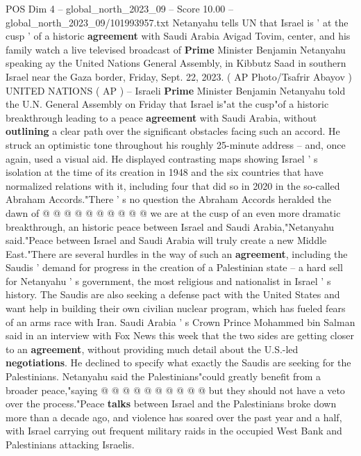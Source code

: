 \begin{textsample}{POS Dim 4 – global\_north\_2023\_09 – Score 10.00 – global\_north\_2023\_09/101993957.txt}  \label{ex:f4_pos_411}
Netanyahu tells UN that Israel is ' at the cusp ' of a historic \textbf{agreement} with Saudi Arabia Avigad Tovim, center, and his family watch a live televised broadcast of \textbf{Prime} Minister Benjamin Netanyahu speaking ay the United Nations General Assembly, in Kibbutz Saad in southern Israel near the Gaza border, Friday, Sept. 22, 2023. ( AP Photo/Tsafrir Abayov ) UNITED NATIONS ( AP ) -- Israeli \textbf{Prime} Minister Benjamin Netanyahu told the U.N.
General Assembly on Friday that Israel is"at the cusp"of a historic breakthrough leading to a peace \textbf{agreement} with Saudi Arabia, without \textbf{outlining} a clear path over the significant obstacles facing such an accord.
He struck an optimistic tone throughout his roughly 25-minute address -- and, once again, used a visual aid.
He displayed contrasting maps showing Israel ' s isolation at the time of its creation in 1948 and the six countries that have normalized relations with it, including four that did so in 2020 in the so-called Abraham Accords."There ' s no question the Abraham Accords heralded the dawn of @ @ @ @ @ @ @ @ @ @ we are at the cusp of an even more dramatic breakthrough, an historic peace between Israel and Saudi Arabia,"Netanyahu said."Peace between Israel and Saudi Arabia will truly create a new Middle East."There are several hurdles in the way of such an \textbf{agreement}, including the Saudis ' demand for progress in the creation of a Palestinian state -- a hard sell for Netanyahu ' s government, the most religious and nationalist in Israel ' s history.
The Saudis are also seeking a defense pact with the United States and want help in building their own civilian nuclear program, which has fueled fears of an arms race with Iran.
Saudi Arabia ' s Crown Prince Mohammed bin Salman said in an interview with Fox News this week that the two sides are getting closer to an \textbf{agreement}, without providing much detail about the U.S.-led \textbf{negotiations}.
He declined to specify what exactly the Saudis are seeking for the Palestinians.
Netanyahu said the Palestinians"could greatly benefit from a broader peace,"saying @ @ @ @ @ @ @ @ @ @ but they should not have a veto over the process."Peace \textbf{talks} between Israel and the Palestinians broke down more than a decade ago, and violence has soared over the past year and a half, with Israel carrying out frequent military raids in the occupied West Bank and Palestinians attacking Israelis.

\end{textsample}

